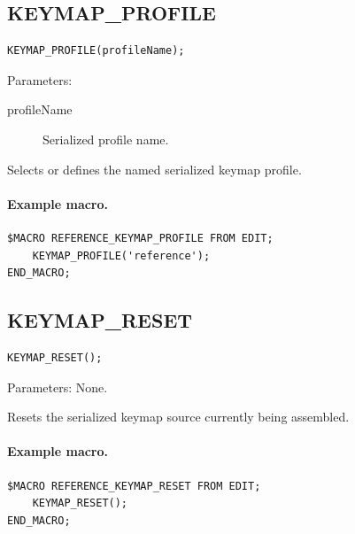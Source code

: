 \documentclass[a4paper,10pt,twoside,openany]{book}
\newenvironment{mrmacextension}{\begin{changebar}}{\end{changebar}}
\begin{document}
\begin{mrmacextension}
\label{prim:procedure-keymap-profile}
\subsection*{KEYMAP\_PROFILE}
\begin{verbatim}
KEYMAP_PROFILE(profileName);
\end{verbatim}
Parameters:
\begin{description}
\item[profileName] Serialized profile name.
\end{description}

Selects or defines the named serialized keymap profile.

\paragraph{Example macro.}
\begin{verbatim}
$MACRO REFERENCE_KEYMAP_PROFILE FROM EDIT;
    KEYMAP_PROFILE('reference');
END_MACRO;
\end{verbatim}
\end{mrmacextension}

\begin{mrmacextension}
\label{prim:procedure-keymap-reset}
\subsection*{KEYMAP\_RESET}
\begin{verbatim}
KEYMAP_RESET();
\end{verbatim}
Parameters: None.

Resets the serialized keymap source currently being assembled.

\paragraph{Example macro.}
\begin{verbatim}
$MACRO REFERENCE_KEYMAP_RESET FROM EDIT;
    KEYMAP_RESET();
END_MACRO;
\end{verbatim}
\end{mrmacextension}
\end{document}
